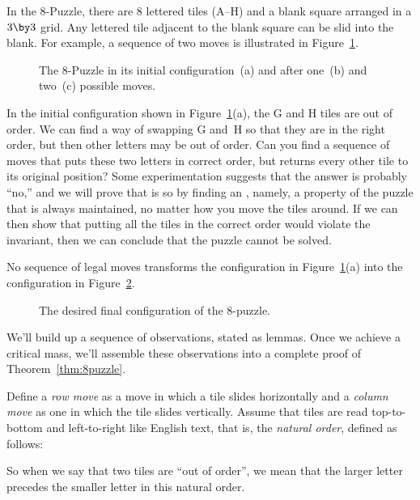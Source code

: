 In the 8-Puzzle, there are 8 lettered tiles (A--H) and a blank square
arranged in a $3 \by 3$ grid.  Any lettered tile adjacent to the blank
square can be slid into the blank.  For example, a sequence of two
moves is illustrated in Figure~\ref{fig:8puzzleA}.

\begin{figure}

\quad
{}
\quad
{}

\caption{The 8-Puzzle in its initial configuration~(a) and after
  one~(b) and two~(c) possible moves.}
\label{fig:8puzzleA}
\end{figure}

In the initial configuration shown in Figure~\ref{fig:8puzzleA}(a),
the G and H tiles are out of order.  We can find a way of swapping G
and~H so that they are in the right order, but then other letters may
be out of order.  Can you find a sequence of moves that puts these two
letters in correct order, but returns every other tile to its original
position?  Some experimentation suggests that the answer is probably
``no,'' and we will prove that is so by finding an ,
namely, a property of the puzzle that is always maintained, no matter
how you move the tiles around.  If we can then show that putting all
the tiles in the correct order would violate the invariant, then we
can conclude that the puzzle cannot be solved.

\begin{theorem}\label{thm:8puzzle}
No sequence of legal moves transforms the configuration in
Figure~\ref{fig:8puzzleA}(a) into the configuration in
Figure~\ref{fig:8puzzlesolved}.
\end{theorem}

\begin{figure}[h]


\caption{The desired final configuration of the 8-puzzle.}
\label{fig:8puzzlesolved}
\end{figure}

We'll build up a sequence of observations, stated as lemmas.  Once we
achieve a critical mass, we'll assemble these observations into a
complete proof of Theorem~\ref{thm:8puzzle}.

Define a \emph{row move} as a move in which a tile slides horizontally
and a \emph{column move} as one in which the tile slides vertically.
Assume that tiles are read top-to-bottom and left-to-right like
English text, that is, the \emph{natural order}, defined as follows:
\begin{figure}[h]
\end{figure}
So when we say that two tiles are ``out of order'', we mean that the
larger letter precedes the smaller letter in this natural order.

